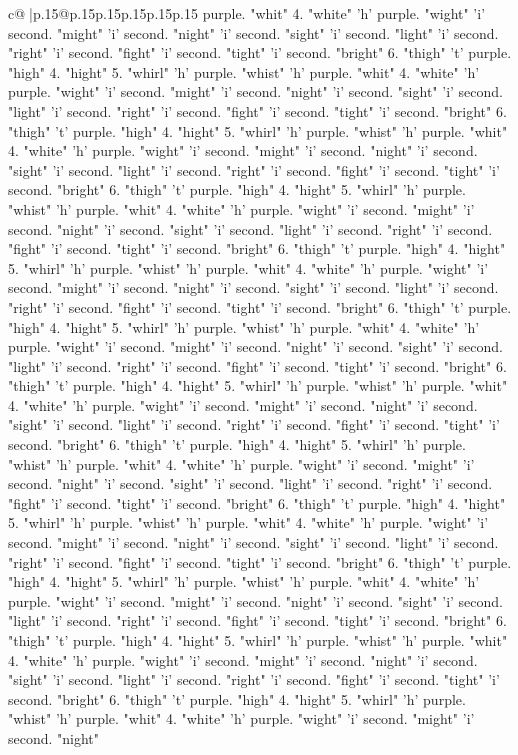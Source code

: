 \documentclass{article}
\begin{document}
{\begin{supertabular}{c@{$\;$}|p{.15\linewidth}@{}p{.15\linewidth}p{.15\linewidth}p{.15\linewidth}p{.15\linewidth}p{.15\linewidth}}
{{{purple. "whit" 4. "white" 'h' purple. "wight" 'i' second. "might" 'i' second. "night" 'i' second. "sight" 'i' second. "light" 'i' second. "right" 'i' second. "fight" 'i' second. "tight" 'i' second. "bright" 6. "thigh" 't' purple. "high" 4. "hight" 5. "whirl" 'h' purple. "whist" 'h' purple. "whit" 4. "white" 'h' purple. "wight" 'i' second. "might" 'i' second. "night" 'i' second. "sight" 'i' second. "light" 'i' second. "right" 'i' second. "fight" 'i' second. "tight" 'i' second. "bright" 6. "thigh" 't' purple. "high" 4. "hight" 5. "whirl" 'h' purple. "whist" 'h' purple. "whit" 4. "white" 'h' purple. "wight" 'i' second. "might" 'i' second. "night" 'i' second. "sight" 'i' second. "light" 'i' second. "right" 'i' second. "fight" 'i' second. "tight" 'i' second. "bright" 6. "thigh" 't' purple. "high" 4. "hight" 5. "whirl" 'h' purple. "whist" 'h' purple. "whit" 4. "white" 'h' purple. "wight" 'i' second. "might" 'i' second. "night" 'i' second. "sight" 'i' second. "light" 'i' second. "right" 'i' second. "fight" 'i' second. "tight" 'i' second. "bright" 6. "thigh" 't' purple. "high" 4. "hight" 5. "whirl" 'h' purple. "whist" 'h' purple. "whit" 4. "white" 'h' purple. "wight" 'i' second. "might" 'i' second. "night" 'i' second. "sight" 'i' second. "light" 'i' second. "right" 'i' second. "fight" 'i' second. "tight" 'i' second. "bright" 6. "thigh" 't' purple. "high" 4. "hight" 5. "whirl" 'h' purple. "whist" 'h' purple. "whit" 4. "white" 'h' purple. "wight" 'i' second. "might" 'i' second. "night" 'i' second. "sight" 'i' second. "light" 'i' second. "right" 'i' second. "fight" 'i' second. "tight" 'i' second. "bright" 6. "thigh" 't' purple. "high" 4. "hight" 5. "whirl" 'h' purple. "whist" 'h' purple. "whit" 4. "white" 'h' purple. "wight" 'i' second. "might" 'i' second. "night" 'i' second. "sight" 'i' second. "light" 'i' second. "right" 'i' second. "fight" 'i' second. "tight" 'i' second. "bright" 6. "thigh" 't' purple. "high" 4. "hight" 5. "whirl" 'h' purple. "whist" 'h' purple. "whit" 4. "white" 'h' purple. "wight" 'i' second. "might" 'i' second. "night" 'i' second. "sight" 'i' second. "light" 'i' second. "right" 'i' second. "fight" 'i' second. "tight" 'i' second. "bright" 6. "thigh" 't' purple. "high" 4. "hight" 5. "whirl" 'h' purple. "whist" 'h' purple. "whit" 4. "white" 'h' purple. "wight" 'i' second. "might" 'i' second. "night" 'i' second. "sight" 'i' second. "light" 'i' second. "right" 'i' second. "fight" 'i' second. "tight" 'i' second. "bright" 6. "thigh" 't' purple. "high" 4. "hight" 5. "whirl" 'h' purple. "whist" 'h' purple. "whit" 4. "white" 'h' purple. "wight" 'i' second. "might" 'i' second. "night" 'i' second. "sight" 'i' second. "light" 'i' second. "right" 'i' second. "fight" 'i' second. "tight" 'i' second. "bright" 6. "thigh" 't' purple. "high" 4. "hight" 5. "whirl" 'h' purple. "whist" 'h' purple. "whit" 4. "white" 'h' purple. "wight" 'i' second. "might" 'i' second. "night" 'i' second. "sight" 'i' second. "light" 'i' second. "right" 'i' second. "fight" 'i' second. "tight" 'i' second. "bright" 6. "thigh" 't' purple. "high" 4. "hight" 5. "whirl" 'h' purple. "whist" 'h' purple. "whit" 4. "white" 'h' purple. "wight" 'i' second. "might" 'i' second. "night" }}}
\end{supertabular}}
\end{document}
